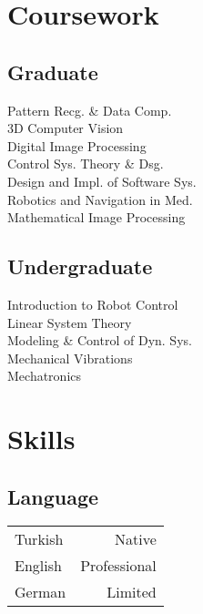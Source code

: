 \documentclass[]{resume}
\begin{document}
\begin{minipage}[t]{0.33\textwidth}
\begin{minipage}[t]{0.90\textwidth}

		\section{Coursework}
		\subsection{Graduate}
		Pattern Recg. \& Data Comp.\\
		3D Computer Vision \\
		Digital Image Processing \\
		Control Sys. Theory \& Dsg. \\
		Design and Impl. of Software Sys.\\
		Robotics and Navigation in Med. \\
		Mathematical Image Processing
		\sectionsep

		\subsection{Undergraduate}
		Introduction to Robot Control\\
		Linear System Theory\\
		Modeling \& Control of Dyn. Sys.\\
		Mechanical Vibrations\\
		Mechatronics\\
		\sectionsep



		\section{Skills}
		\subsection{Language}
		\vspace{3pt}
		\begin{tabular}{@{}p{40pt}r}
			Turkish & Native       \\
			English & Professional \\
			German  & Limited      \\
		\end{tabular}
		\sectionsep


\end{minipage}
\end{minipage}
\end{document}
